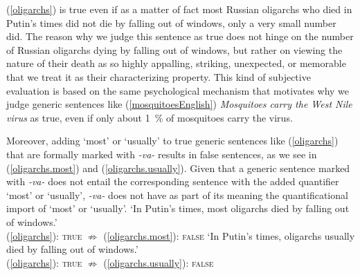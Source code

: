 \documentclass[output=paper,colorlinks,citecolor=brown]{langscibook}
\begin{document}
\noindent
(\ref{oligarchs}) is true even if as a matter of fact most Russian oligarchs who died
in Putin's times did not die by falling out of windows, only a very small number
did. The reason why we judge this sentence as true does not hinge on the number of Russian oligarchs dying by falling out of windows, but rather on
viewing the nature of their death as so highly appalling, striking, unexpected,
or memorable that we treat it as their characterizing property. This kind of subjective evaluation
is based on the same psychological mechanism that motivates why we
judge generic sentences like (\ref{mosquitoesEnglish}) \textit{Mosquitoes carry the West Nile virus} as true,
even if only about \qty{1}{\percent} of mosquitoes carry the virus.

Moreover, adding `most'  or `usually'  to true generic sentences like  (\ref{oligarchs}) that are formally marked with \textit{-va-} results in false sentences, as we see in (\ref{oligarchs.most}) and (\ref{oligarchs.usually}). Given that a generic sentence marked with \textit{-va-} does not entail the corresponding sentence with the added quantifier
`most'  or `usually', \textit{-va-} does not have as part of its meaning
the quantificational import of `most'  or `usually'.
\ea
{}
\glt `In Putin's times, most oligarchs died by falling out of windows.'\\
(\ref{oligarchs}): \textsc{true} $\nRightarrow$ (\ref{oligarchs.most}): \textsc{false}
\glt `In Putin's times,  oligarchs usually died by falling out of windows.'\\
(\ref{oligarchs}): \textsc{true} $\nRightarrow$ (\ref{oligarchs.usually}): \textsc{false}
\z
\z
\end{document}
